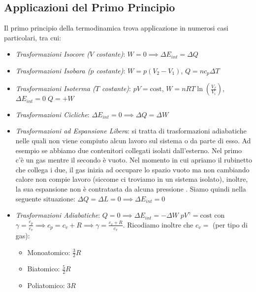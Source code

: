         \subsection*{Applicazioni del Primo Principio} Il primo principio della 
        termodinamica trova applicazione in numerosi casi particolari, tra cui:
            \begin{itemize}
                \item \textit{Trasformazioni Isocore ($V$ costante)}:
                    $W = 0 \implies \Delta E_{int} = \Delta Q$
                \item \textit{Trasformazioni Isobara ($p$ costante)}:
                    $W = p(V_2-V_1)$, $Q = nc_p\Delta T$
                \item \textit{Trasformazioni Isoterma ($T$ costante)}:
                    $pV = \text{cost}$, $W = nRT\ln(\frac{V_f}{V_i})$, 
                    $\Delta E_{int} = 0 \; Q = + W$
                \item \textit{Trasformazioni Cicliche}:
                    $\Delta E_{int} = 0 \implies \Delta Q = \Delta W$
                \item \textit{Trasformazioni ad Espansione Libera}: si tratta 
                        di trasformazioni adiabatiche nelle quali non viene 
                        compiuto alcun lavoro sul sistema o da parte di esso.
                        Ad esempio se abbiamo due contenitori collegati isolati 
                        dall'esterno. Nel primo c'è un gas mentre il secondo è
                        vuoto. Nel momento in cui apriamo il rubinetto che 
                        collega i due, il gas inizia ad occupare lo spazio 
                        vuoto ma non cambiando calore non compie lavoro 
                        (siccome ci troviamo in un sistema isolato), inoltre,
                        la sua espansione non è contratasta da alcuna pressione
                        . Siamo quindi nella seguente situazione:
                        $\Delta Q = \Delta L = 0 \implies \Delta E_{int} = 0$
                \item \textit{Trasformazioni Adiabatiche}: 
                        $Q=0 \implies \Delta E_{int} = -\Delta W \;
                        pV^\gamma = \text{cost}
                        $ con $\gamma = \frac{c_p}{c_v} \implies c_p = c_v + R
                        \implies \gamma = \frac{c_v + R}{c_v}$. Ricodiamo 
                        inoltre che $c_v = $ (per tipo di gas):
                        \begin{itemize}
                            \item Monoatomico: $\frac{3}{2} R$
                            \item Biatomico: $\frac{5}{2} R$
                            \item Poliatomico: $3 R$
                        \end{itemize}
            \end{itemize}

